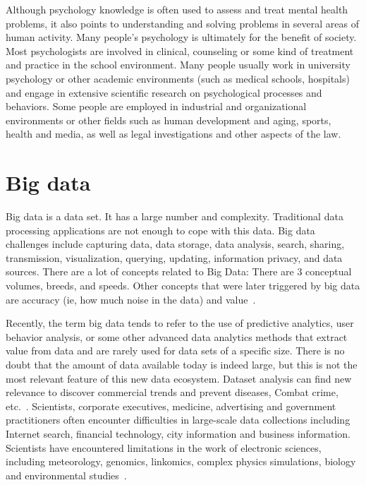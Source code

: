 Although psychology knowledge is often used to assess and treat 
mental health problems, it also points to understanding and solving 
problems in several areas of human activity. Many people's psychology
 is ultimately for the benefit of society. Most psychologists are 
involved in clinical, counseling or some kind of treatment and 
practice in the school environment. Many people usually work in 
university psychology or other academic environments (such as medical
 schools, hospitals) and engage in extensive scientific research on 
psychological processes and behaviors. Some people are employed in 
industrial and organizational environments or other fields such as 
human development and aging, sports, health and media, as well as 
legal investigations and other aspects of the law.

\section{Big data}

Big data is a data set. It has a large number and complexity. 
Traditional data processing applications are not enough to cope with 
this data. Big data challenges include capturing data, data storage, 
data analysis, search, sharing, transmission, visualization, querying,
 updating, information privacy, and data sources. There are a lot of 
concepts related to Big Data: There are 3 conceptual volumes, breeds,
 and speeds. Other concepts that were later triggered by big data are
 accuracy (ie, how much noise in the data) and value~\cite{editor03}.

Recently, the term big data tends to refer to the use of predictive 
analytics, user behavior analysis, or some other advanced data 
analytics methods that extract value from data and are rarely used for
 data sets of a specific size. There is no doubt that the amount of 
data available today is indeed large, but this is not the most 
relevant feature of this new data ecosystem. Dataset analysis can 
find new relevance to discover commercial trends and prevent 
diseases, Combat crime, etc.~\cite{editor04}.  Scientists, corporate 
executives, medicine, advertising and government practitioners often 
encounter difficulties in large-scale data collections including Internet 
search, financial technology, city information and business 
information. Scientists have encountered limitations in the work of 
electronic sciences, including meteorology, genomics, linkomics, 
complex physics simulations, biology and environmental studies~\cite{editor05}.

